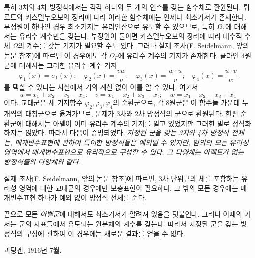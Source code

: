 특히 3차와 4차 방정식에서는 각각 하나와 두 개의 인수를 갖는 함수체로 환원된다. 뤼로트와 카스텔누오보의 정리에 따라 이러한 함수체에는 언제나 최소기저가 존재한다. 부정원이 하나인 경우 최소기저는 유리연산으로 유도할 수 있으므로, 특히 \(\Omega_\Gamma\)에 대해서는 유리수 계수만을 갖는다. 부정원이 둘이면 카스텔누오보의 정리에 따라 대수적 수체 \(\Omega\)의 계수를 갖는 기저가 필요할 수도 있다. 그러나 실제 조사(F. Seidelmann, 앞의 논문 참조)에 따르면 이 경우에도 각 \(\Omega_\Gamma\)에 유리수 계수의 기저가 존재한다. 클라인 4원군에 대해서는 그러한 유리수 계수 기저
\[
\varphi_1(x)=\sigma_1(x);\quad \varphi_2(x)=\frac{v w}{u};\quad \varphi_3(x)=\frac{w\cdot u}{v};\quad \varphi_4(x)=\frac{u\cdot v}{w}
\]
를 택할 수 있다는 사실에서 거의 계산 없이 이를 알 수 있다. 여기서
\[
u=x_1+x_2-x_3-x_4;\quad v=x_1-x_2+x_3-x_4;\quad w=x_1-x_2-x_3+x_4
\]
이다. 교대군은 세 기저함수 \(\varphi_2,\varphi_3,\varphi_4\)의 순환군으로, 각 8원군은 이 함수들 가운데 두 개씩의 대칭군으로 옮겨가므로, 문제가 3차와 2차 방정식의 군으로 환원된다. 한편 순환군에 대해서는 아벨이 이미 유리수 계수의 기저를 알고 있었지만 그러한 말로 정식화하지는 않았다. 따라서 다음이 증명되었다. \emph{지정된 군을 갖는 3차와 4차 방정식 전체는, 매개변수표현에 관하여 특이한 방정식들은 예외일 수 있지만, 임의의 모든 유리성 영역에서 매개변수표현으로 유리적으로 구성할 수 있다. 그 다양체는 아펙트가 없는 방정식들의 다양체와 같다.}

실제 조사(F. Seidelmann, 앞의 논문 참조)에 따르면, 3차 단위근의 체를 포함하는 유리성 영역에 대한 교대군의 경우에만 보충표현이 필요하다. 그 밖의 모든 경우에는 매개변수표현 하나가 예외 없이 방정식 전체를 준다.

끝으로 모든 \emph{아벨군}에 대해서도 최소기저가 알려져 있음을 덧붙인다. 그러나 이때의 기저는 군의 지표들에서 유도되는 원분체의 계수를 갖는다. 따라서 지정된 군을 갖는 방정식의 구성에 관하여 이 경우에는 새로운 결과를 얻을 수 없다.

괴팅겐, 1916년 7월.

\clearpage
\setcounter{footnote}{0}
